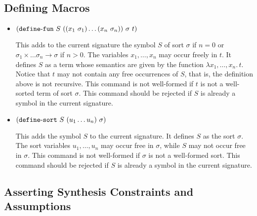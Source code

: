 \documentclass[english,a4paper,10pt]{article}
\begin{document}
\subsection{Defining Macros}

\begin{itemize}
\item ${\tt (}{\tt define\mbox{-}fun}\mbox{ }S\mbox{ }{\tt (}{\tt (}x_1\mbox{ }\sigma_1{\tt )} \ldots {\tt (}x_n\mbox{ }\sigma_n{\tt )}{\tt )}\mbox{ }\sigma\mbox{ }t{\tt )}$

This adds to the current signature
the symbol $S$ of sort $\sigma$
if $n=0$ or $\sigma_1 \times \ldots \sigma_n \rightarrow \sigma$ if $n>0$.
The variables $x_1, \ldots, x_n$ may occur freely in $t$.
It defines $S$ as a term whose semantics are given by the function
$\lambda x_1, \ldots, x_n.\, t$.
Notice that $t$ may not contain any free occurrences of $S$,
that is, the definition above is not recursive.
This command is not well-formed if $t$ is not a well-sorted
term of sort $\sigma$.
This command should be rejected if $S$ is already
a symbol in the current signature.

\item ${\tt (}{\tt define\mbox{-}sort}\mbox{ }S\mbox{ }{\tt (}u_1 \ldots u_n{\tt )}\mbox{ }\sigma{\tt )}$

This adds the symbol $S$ to the current signature.
It defines $S$ as the sort $\sigma$.
The sort variables $u_1, \ldots, u_n$
may occur free in $\sigma$,
while $S$ may not occur free in $\sigma$.
This command is not well-formed if $\sigma$
is not a well-formed sort.
This command should be rejected if $S$ is already
a symbol in the current signature.

\end{itemize}

\subsection{Asserting Synthesis Constraints and Assumptions}
\end{document}
